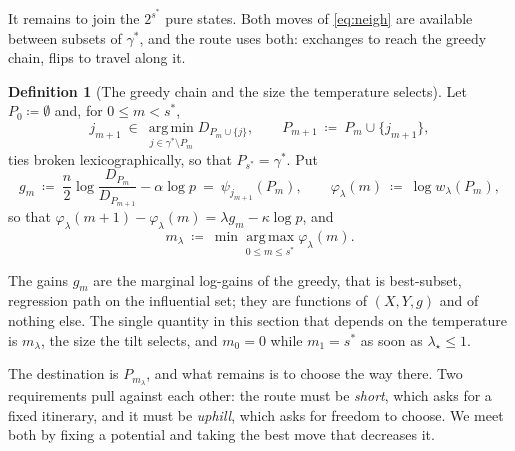 \documentclass[aos]{imsart}
\theoremstyle{plain}
\theoremstyle{definition}
\newtheorem{definition}{Definition}[section]
\begin{document}
    It remains to join the $2^{s^{\ast}}$ pure states. Both moves of
    \eqref{eq:neigh} are available between subsets of $\gamma^{\ast}$, and
    the route uses both: exchanges to reach the greedy chain, flips to travel
    along it.

    \begin{definition}[The greedy chain and the size the temperature selects]
        \label{def:greedy}
        Let $P_0\coloneq\emptyset$ and, for $0\leq m<s^{\ast}$,
        \begin{equation}
            \label{eq:greedychain}
            j_{m+1}\ \in\ \operatorname*{arg\,min}
            _{j\in\gamma^{\ast}\setminus P_m}D_{P_m\cup\{j\}},
            \qquad
            P_{m+1}\ \coloneq\ P_m\cup\{j_{m+1}\},
        \end{equation}
        ties broken lexicographically, so that $P_{s^{\ast}}=\gamma^{\ast}$.
        Put
        \begin{equation}
            \label{eq:gains}
            g_m\ \coloneq\ \frac n2\log\frac{D_{P_m}}{D_{P_{m+1}}}
            -\alpha\log p\ =\ \psi_{j_{m+1}}(P_m),
            \qquad
            \varphi_\lambda(m)\ \coloneq\ \log w_\lambda(P_m) ,
        \end{equation}
        so that
        $\varphi_\lambda(m+1)-\varphi_\lambda(m)=\lambda g_m-\kappa\log p$,
        and
        \begin{equation}
            \label{eq:mlam}
            m_\lambda\ \coloneq\ \min\operatorname*{arg\,max}
            _{0\leq m\leq s^{\ast}}\varphi_\lambda(m) .
        \end{equation}
    \end{definition}

    The gains $g_m$ are the marginal log-gains of the greedy, that is
    best-subset, regression path on the influential set; they are functions
    of $(X,Y,g)$ and of nothing else. The single quantity in this section
    that depends on the temperature is $m_\lambda$, the size the tilt
    selects, and $m_0=0$ while $m_1=s^{\ast}$ as soon as
    $\lambda_\star\leq1$.

    The destination is $P_{m_\lambda}$, and what remains is to choose the
    way there. Two requirements pull against each other: the route must be
    \emph{short}, which asks for a fixed itinerary, and it must be
    \emph{uphill}, which asks for freedom to choose. We meet both by fixing
    a potential and taking the best move that decreases it.
\end{document}
